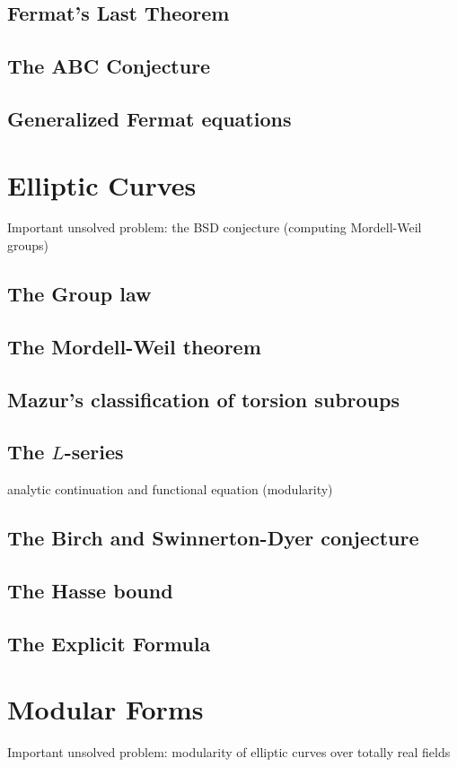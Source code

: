 \documentclass{book}
\begin{document}
\section{Fermat's Last Theorem}
\section{The ABC Conjecture}
\section{Generalized Fermat equations}



\chapter{Elliptic Curves}
Important unsolved problem: the BSD conjecture (computing Mordell-Weil groups)

\section{The Group law}
\section{The Mordell-Weil theorem}
\section{Mazur's classification of torsion subroups}
\section{The $L$-series}
analytic continuation and functional equation (modularity)
\section{The Birch and Swinnerton-Dyer conjecture}
\section{The Hasse bound}
\section{The Explicit Formula}


\chapter{Modular Forms}
Important unsolved problem: modularity of elliptic curves
over totally real fields
\end{document}
